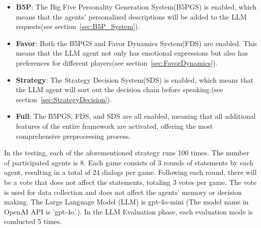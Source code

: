 \begin{itemize} 
  \item \textbf{B5P}: The Big Five Personality Generation System(B5PGS) is enabled, which means that the agents' personalized descriptions will be added to the LLM requests(see section~\ref{sec:B5P_System}).
  \item \textbf{Favor}: Both the B5PGS and Favor Dynamics System(FDS) are enabled. This means that the LLM agent not only has emotional expressions but also has preferences for different players(see section~\ref{sec:FavorDynamics}).
  \item \textbf{Strategy}: The Strategy Decision System(SDS) is enabled, which means that the LLM agent will sort out the decision chain before speaking.(see section~\ref{sec:StrategyDecision}).
  \item \textbf{Full}: The B5PGS, FDS, and SDS are all enabled, meaning that all additional features of the entire framework are activated, offering the most comprehensive preprocessing process.
\end{itemize}

In the testing, each of the aforementioned strategy runs 100 times. The number of participated agents is 8. Each game consists of 3 rounds of statements by each agent, resulting in a total of 24 dialogs per game. Following each round, there will be a vote that does not affect the statements, totaling 3 votes per game. The vote is used for data collection and does not affect the agents' memory or decision making. The Large Language Model   (LLM) is gpt-4o-mini (The model name in OpenAI API is 'gpt-4o'.). In the LLM Evaluation phase, each evaluation mode is conducted 5 times.


\begin{table}[h]
  \renewcommand{\arraystretch}{1.3}
  \setlength{\tabcolsep}{10pt}
      \centering
  \caption{ The System in each of the methods in the experiment. $ \times $ for the system is included in the method
  }
  \label{tab:Experiment_Setup}
\end{table}



